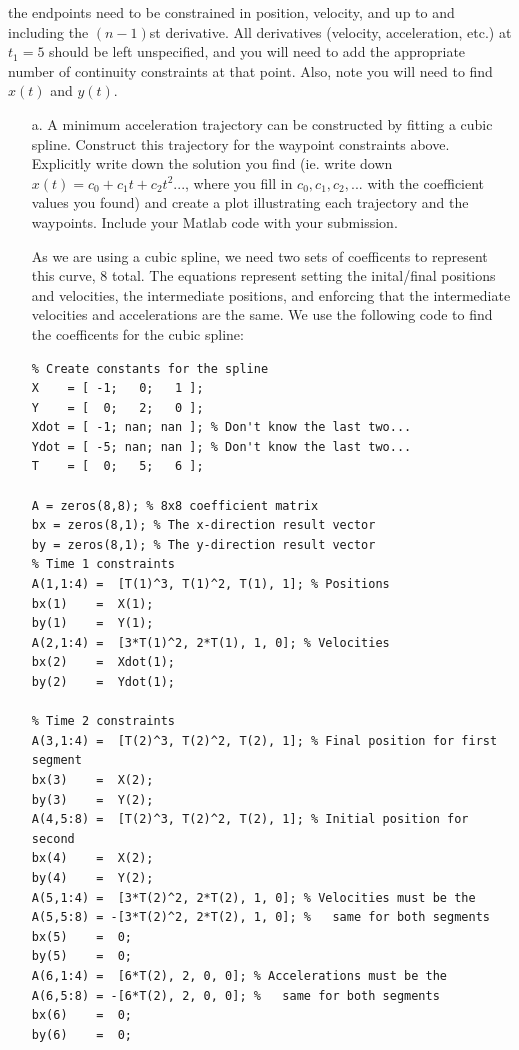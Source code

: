 \documentclass[english]{article}
\begin{document}
\noindent the endpoints need to be constrained in position, velocity, and up to and including the $(n-1)$st derivative. All derivatives (velocity, acceleration, etc.) at $t_1 = 5$ should be left unspecified, and you will need to add the appropriate number of continuity constraints at that point. Also, note you will need to find $x(t)$ and $y(t)$.

\begin{enumerate}
 \item[a.] A minimum acceleration trajectory can be constructed by fitting a cubic spline. Construct this trajectory for the waypoint constraints above. Explicitly write down the solution you find (ie. write down $x(t) = c_0 + c_1 t + c_2 t^2 ...$, where you fill in $c_0, c_1, c_2, ...$ with the coefficient values you found) and create a plot illustrating each trajectory and the waypoints. Include your Matlab code with your submission. 

As we are using a cubic spline, we need two sets of coefficents to represent this curve, 8 total.
The equations represent setting the inital/final positions and velocities, the intermediate positions, and
enforcing that the intermediate velocities and accelerations are the same.
We use the following code to find the coefficents for the cubic spline: 
\begin{lstlisting}
% Create constants for the spline
X    = [ -1;   0;   1 ];
Y    = [  0;   2;   0 ];
Xdot = [ -1; nan; nan ]; % Don't know the last two...
Ydot = [ -5; nan; nan ]; % Don't know the last two...
T    = [  0;   5;   6 ];

A = zeros(8,8); % 8x8 coefficient matrix
bx = zeros(8,1); % The x-direction result vector
by = zeros(8,1); % The y-direction result vector
% Time 1 constraints
A(1,1:4) =  [T(1)^3, T(1)^2, T(1), 1]; % Positions
bx(1)    =  X(1);
by(1)    =  Y(1);
A(2,1:4) =  [3*T(1)^2, 2*T(1), 1, 0]; % Velocities
bx(2)    =  Xdot(1);
by(2)    =  Ydot(1);

% Time 2 constraints
A(3,1:4) =  [T(2)^3, T(2)^2, T(2), 1]; % Final position for first segment
bx(3)    =  X(2);
by(3)    =  Y(2);
A(4,5:8) =  [T(2)^3, T(2)^2, T(2), 1]; % Initial position for second
bx(4)    =  X(2);
by(4)    =  Y(2);
A(5,1:4) =  [3*T(2)^2, 2*T(2), 1, 0]; % Velocities must be the
A(5,5:8) = -[3*T(2)^2, 2*T(2), 1, 0]; %   same for both segments
bx(5)    =  0;
by(5)    =  0;
A(6,1:4) =  [6*T(2), 2, 0, 0]; % Accelerations must be the
A(6,5:8) = -[6*T(2), 2, 0, 0]; %   same for both segments
bx(6)    =  0;
by(6)    =  0;


\end{lstlisting}
\end{enumerate}
\end{document}
